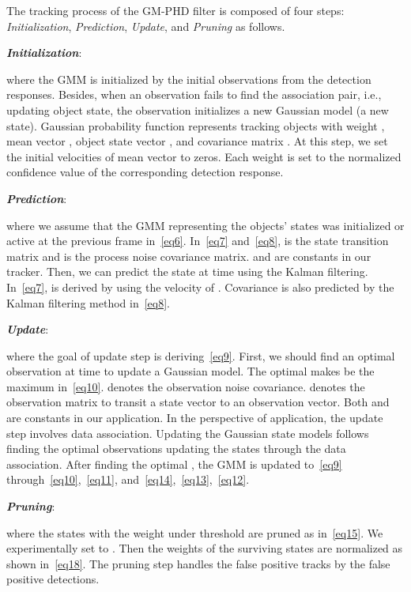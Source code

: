 \documentclass[journal]{IEEEtran}
\newcounter{ct}
\begin{document}
The tracking process of the GM-PHD filter is composed of four steps: \textit{Initialization}, \textit{Prediction}, \textit{Update}, and \textit{Pruning} as follows.

    
\textit{\textbf{Initialization}}:

where the GMM is initialized by the initial observations from the detection responses. Besides, when an observation fails to find the association pair, i.e., updating object state, the observation initializes a new Gaussian model (a new state). Gaussian probability function  represents tracking objects with weight , mean vector , object state vector , and covariance matrix . At this step, we set the initial velocities of mean vector to zeros. Each weight is set to the normalized confidence value of the corresponding detection response.


\textit{\textbf{Prediction}}:

where we assume that the GMM representing the objects' states was initialized or active at the previous frame  in~\eqref{eq6}. 
In~\eqref{eq7} and~\eqref{eq8},  is the state transition matrix and  is the process noise covariance matrix.  and  are constants in our tracker.
Then, we can predict the state at time  using the Kalman filtering. In~\eqref{eq7},  is derived by using the velocity of . Covariance  is also predicted by the Kalman filtering method in~\eqref{eq8}.   

\textit{\textbf{Update}}:

where the goal of update step is deriving~\eqref{eq9}. First, we should find an optimal observation  at time  to update a Gaussian model. The optimal  makes  be the maximum in~\eqref{eq10}.  denotes the observation noise covariance.  denotes the observation matrix to transit a state vector to an observation vector. Both  and  are constants in our application.
In the perspective of application, the update step involves data association. Updating the Gaussian state models follows finding the optimal observations updating the states through the data association. After finding the optimal , the GMM is updated to~\eqref{eq9} through~\eqref{eq10},~\eqref{eq11}, and~\eqref{eq14},~\eqref{eq13},~\eqref{eq12}.

\textit{\textbf{Pruning}}:

where the states with the weight under threshold  are pruned as in~\eqref{eq15}. We experimentally set  to . Then the weights of the surviving states are normalized as shown in~\eqref{eq18}. The pruning step handles the false positive tracks by the false positive detections.
\end{document}
